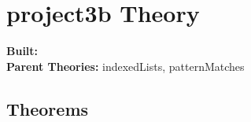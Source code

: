 \documentclass[11pt, twoside]{article}
\begin{document}


\tableofcontents
\cleardoublepage
\HOLpagestyle

\section{project3b Theory}
\begin{flushleft}
\textbf{Built:} \HOLprojectThreebDate \\[2pt]
\textbf{Parent Theories:} indexedLists, patternMatches
\end{flushleft}



\subsection{Theorems}

\HOLprojectThreebTheorems

\HOLindex
\end{document}
